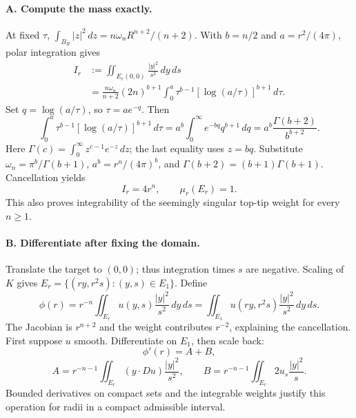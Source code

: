 \begin{expandedproof}
\paragraph{A. Compute the mass exactly.}
At fixed $\tau$, $\int_{B_R}|z|^2\,dz=n\omega_n R^{n+2}/(n+2)$.
With $b=n/2$ and $a=r^2/(4\pi)$, polar integration gives
\[
 \begin{split}
 I_r&:=\iint_{E_r(0,0)}\frac{|y|^2}{s^2}\,dy\,ds\\
 &=\frac{n\omega_n}{n+2}(2n)^{b+1}
 \int_0^a\tau^{b-1}[\log(a/\tau)]^{b+1}\,d\tau .
 \end{split}
\]
Set $q=\log(a/\tau)$, so $\tau=ae^{-q}$. Then
\[
 \int_0^a\tau^{b-1}[\log(a/\tau)]^{b+1}\,d\tau
 =a^b\int_0^\infty e^{-bq}q^{b+1}\,dq
 =a^b\frac{\Gamma(b+2)}{b^{b+2}}.
\]
Here $\Gamma(c)=\int_0^\infty z^{c-1}e^{-z}\,dz$;
the last equality uses $z=bq$.
Substitute $\omega_n=\pi^b/\Gamma(b+1)$,
$a^b=r^n/(4\pi)^b$, and $\Gamma(b+2)=(b+1)\Gamma(b+1)$.
Cancellation yields
\[
 I_r=4r^n,\qquad \mu_r(E_r)=1.
\]
This also proves integrability of the seemingly singular top-tip weight
for every $n\geq1$.

\paragraph{B. Differentiate after fixing the domain.}
Translate the target to $(0,0)$; thus integration times $s$ are negative.
Scaling of $K$ gives $E_r=\{(ry,r^2s):(y,s)\in E_1\}$.
Define
\[
 \phi(r)=r^{-n}\iint_{E_r}u(y,s)\frac{|y|^2}{s^2}\,dy\,ds
 =\iint_{E_1}u(ry,r^2s)\frac{|y|^2}{s^2}\,dy\,ds.
\]
The Jacobian is $r^{n+2}$ and the weight contributes $r^{-2}$,
explaining the cancellation. First suppose $u$ smooth.
Differentiate on $E_1$, then scale back:
\[
 \phi'(r)=A+B,
\]
\[
 A=r^{-n-1}\iint_{E_r}(y\cdot Du)\frac{|y|^2}{s^2},\qquad
 B=r^{-n-1}\iint_{E_r}2u_s\frac{|y|^2}{s}.
 \tag{AB}
\]
Bounded derivatives on compact sets and the integrable weights justify
this operation for radii in a compact admissible interval.


\end{expandedproof}

